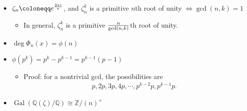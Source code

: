 \begin{concept}

\envlist

\begin{itemize}
\tightlist
\item
  \(\zeta_n \coloneqq e^{2\pi i \over n}\), and \(\zeta_n^k\) is a
  primitive \(n\)th root of unity \(\iff \gcd(n, k) = 1\)

  \begin{itemize}
  \tightlist
  \item
    In general, \(\zeta_n^k\) is a primitive \({n \over \gcd(n, k)}\)th
    root of unity.
  \end{itemize}
\item
  \(\deg \Phi_n(x) = \phi(n)\)
\item
  \(\phi(p^k) = p^k - p^{k-1} = p^{k-1}(p-1)\)

  \begin{itemize}
  \tightlist
  \item
    Proof: for a nontrivial gcd, the possibilities are
    \begin{align*}
    p, 2p, 3p, 4p, \cdots, p^{k-2}p, p^{k-1}p
    .\end{align*}
  \end{itemize}
\item
  \(\operatorname{Gal}({\mathbb{Q}}(\zeta)/{\mathbb{Q}}) \cong {\mathbb{Z}}/(n)^{\times}\)
\end{itemize}

\end{concept}

